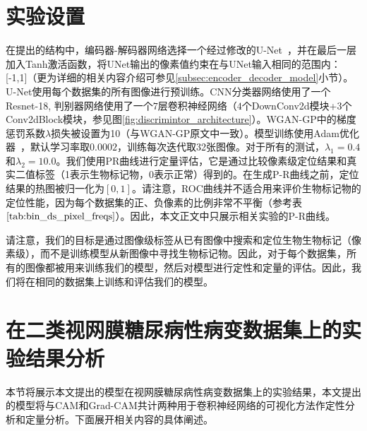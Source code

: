 \section{实验设置}
在提出的结构中，编码器-解码器网络选择一个经过修改的U-Net~\cite{iglovikov2018ternausnet}，并在最后一层加入Tanh激活函数，将UNet输出的像素值约束在与UNet输入相同的范围内：[-1,1]（更为详细的相关内容介绍可参见\ref{subsec:encoder_decoder_model}小节）。U-Net使用每个数据集的所有图像进行预训练。CNN分类器网络使用了一个Resnet-18, 判别器网络使用了一个$7$层卷积神经网络（$4$个DownConv2d模块+$3$个Conv2dBlock模块，参见图\ref{fig:discrimintor_architecture}）。WGAN-GP中的梯度惩罚系数$\lambda$损失被设置为10（与WGAN-GP原文中一致）。模型训练使用Adam优化器~\cite{kingma2014adam}，默认学习率取$0.0002$，训练每次迭代取32张图像。对于所有的测试，$\lambda_1 = 0.4$和$\lambda_{2} = 10.0$。我们使用PR曲线进行定量评估，它是通过比较像素级定位结果和真实二值标签（1表示生物标记物，0表示正常）得到的。在生成P-R曲线之前，定位结果的热图被归一化为$[0,1]$。请注意，ROC曲线并不适合用来评价生物标记物的定位性能，因为每个数据集的正、负像素的比例非常不平衡（参考表$\ref{tab:bin_ds_pixel_freqs}$）。因此，本文正文中只展示相关实验的P-R曲线。

请注意，我们的目标是通过图像级标签从已有图像中搜索和定位生物生物标记（像素级），而不是训练模型从新图像中寻找生物标记物。因此，对于每个数据集，所有的图像都被用来训练我们的模型，然后对模型进行定性和定量的评估。因此，我们将在相同的数据集上训练和评估我们的模型。

\section{在二类视网膜糖尿病性病变数据集上的实验结果分析}\label{sec:bin_dr_ds_experiment}
本节将展示本文提出的模型在视网膜糖尿病性病变数据集上的实验结果，本文提出的模型将与CAM和Grad-CAM共计两种用于卷积神经网络的可视化方法作定性分析和定量分析。下面展开相关内容的具体阐述。

